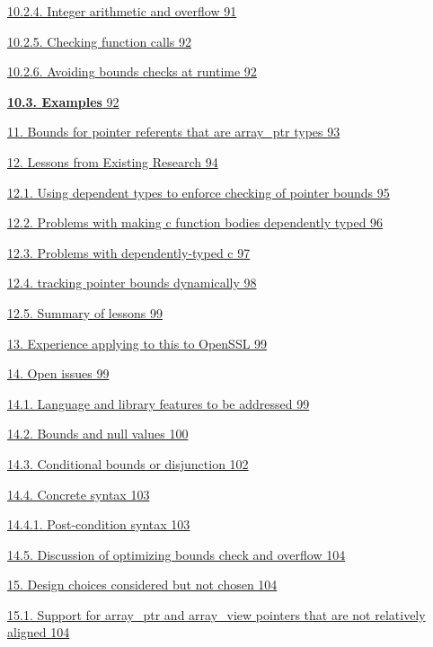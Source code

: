 \documentclass[]{article}
\begin{document}
\protect\hyperlink{ux5fToc440551942}{10.2.4. Integer arithmetic and
overflow 91}

\protect\hyperlink{ux5fToc440551943}{10.2.5. Checking function calls 92}

\protect\hyperlink{ux5fToc440551944}{10.2.6. Avoiding bounds checks at
runtime 92}

\protect\hyperlink{ux5fToc440551945}{\textbf{10.3. Examples} 92}

\protect\hyperlink{ux5fToc440551946}{11. Bounds for pointer referents
that are array\_ptr types 93}

\protect\hyperlink{ux5fToc440551947}{12. Lessons from Existing Research
94}

\protect\hyperlink{ux5fToc440551948}{12.1. Using dependent types to
enforce checking of pointer bounds 95}

\protect\hyperlink{ux5fToc440551949}{12.2. Problems with making c
function bodies dependently typed 96}

\protect\hyperlink{ux5fToc440551950}{12.3. Problems with
dependently-typed c 97}

\protect\hyperlink{ux5fToc440551951}{12.4. tracking pointer bounds
dynamically 98}

\protect\hyperlink{ux5fToc440551952}{12.5. Summary of lessons 99}

\protect\hyperlink{ux5fToc440551953}{13. Experience applying to this to
OpenSSL 99}

\protect\hyperlink{ux5fToc440551954}{14. Open issues 99}

\protect\hyperlink{ux5fToc440551955}{14.1. Language and library features
to be addressed 99}

\protect\hyperlink{ux5fToc440551956}{14.2. Bounds and null values 100}

\protect\hyperlink{ux5fToc440551957}{14.3. Conditional bounds or
disjunction 102}

\protect\hyperlink{ux5fToc440551958}{14.4. Concrete syntax 103}

\protect\hyperlink{ux5fToc440551959}{14.4.1. Post-condition syntax 103}

\protect\hyperlink{ux5fToc440551960}{14.5. Discussion of optimizing
bounds check and overflow 104}

\protect\hyperlink{ux5fToc440551961}{15. Design choices considered but
not chosen 104}

\protect\hyperlink{ux5fToc440551962}{15.1. Support for array\_ptr and
array\_view pointers that are not relatively aligned 104}
\end{document}
